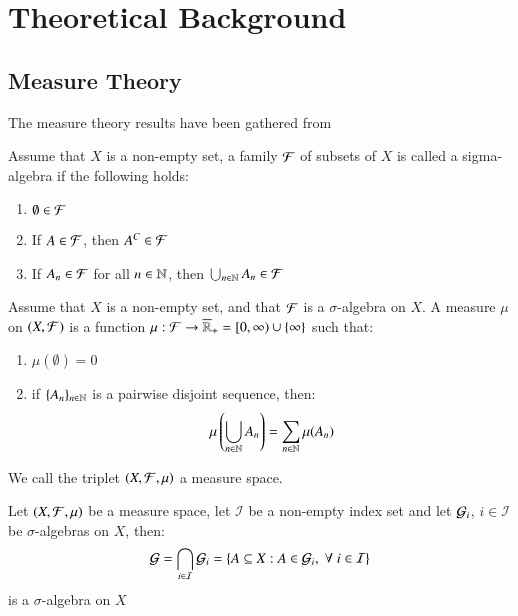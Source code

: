 \chapter{Theoretical Background}
\label{chp_theoretical_background}


\section{Measure Theory}
The measure theory results have been gathered from \cite{lindstrom2017}

\begin{definition}
Assume that $X$ is a non-empty set, a family $\mathcal{F}$ of subsets of $X$ is called a sigma-algebra if the following holds: 
\begin{enumerate}[label= (\roman*), leftmargin=*]
  \item $\emptyset \in \mathcal{F}$
  \item If $A\in \mathcal{F}$, then $A^{C}\in \mathcal{F}$ 
  \item If $A_{n} \in \mathcal{F}$ for all $n\in \mathbb{N}$, then $\bigcup_{n\in \mathbb{N}}A_{n}\in \mathcal{F}$
\end{enumerate}
\end{definition}

\begin{definition}
Assume that $X$ is a non-empty set, and that $\mathcal{F}$ is a $\sigma$-algebra on $X$. 
A measure $\mu$ on $(X,\mathcal{F})$ is a function $\mu:\mathcal{F}\to \overline{\mathbb{R}}_{+} =[0,\infty)\cup \{\infty\}$ such that: 
\begin{enumerate}[label = (\roman*), leftmargin=*]
    \item $\mu(\emptyset) = 0$ 
    \item if $\{A_{n}\}_{n\in \mathbb{N}}$ is a pairwise disjoint sequence, then: 
    \[\mu\left(\bigcup_{n\in \mathbb{N}}A_{n}\right) = \sum_{n\in \mathbb{N}}\mu(A_{n})\]
\end{enumerate}
We call the triplet $(X,\mathcal{F},\mu)$ a measure space.
\end{definition}

\begin{proposition}
Let $(X,\mathcal{F}, \mu)$ be a measure space, let $\mathcal{I}$ be a non-empty index set and let $\mathcal{G}_{i}$, $i\in \mathcal{I}$ be $\sigma$-algebras on $X$, then: 
\[\mathcal{G} = \bigcap_{i \in \mathcal{I}}\mathcal{G}_{i} = \{A\subseteq X: A\in \mathcal{G}_{i},\; \forall\; i\in \mathcal{I}\}
\] 
is a $\sigma$-algebra on $X$
\end{proposition}

